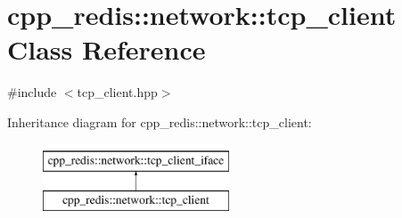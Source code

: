 \hypertarget{classcpp__redis_1_1network_1_1tcp__client}{}\section{cpp\+\_\+redis\+:\+:network\+:\+:tcp\+\_\+client Class Reference}
\label{classcpp__redis_1_1network_1_1tcp__client}


{\ttfamily \#include $<$tcp\+\_\+client.\+hpp$>$}

Inheritance diagram for cpp\+\_\+redis\+:\+:network\+:\+:tcp\+\_\+client\+:\begin{figure}[H]
\begin{center}
\leavevmode
\includegraphics[height=2.000000cm]{classcpp__redis_1_1network_1_1tcp__client}
\end{center}
\end{figure}
